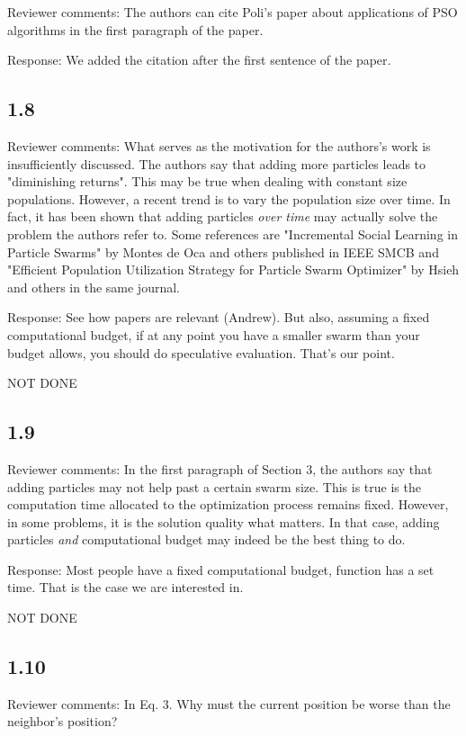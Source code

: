 \documentclass[onecolumn, 12pt]{article}
\begin{document}
Reviewer comments: The authors can cite Poli's paper about applications of PSO
algorithms in the first paragraph of the paper.

Response: We added the citation after the first sentence of the paper.

\subsection*{1.8}

Reviewer comments: What serves as the motivation for the authors's work is
insufficiently discussed.  The authors say that adding more particles leads to
"diminishing returns". This may be true when dealing with constant size
populations.  However, a recent trend is to vary the population size over time.
In fact, it has been shown that adding particles \emph{over time} may actually
solve the problem the authors refer to. Some references are "Incremental Social
Learning in Particle Swarms" by Montes de Oca and others published in IEEE SMCB
and "Efficient Population Utilization Strategy for Particle Swarm Optimizer" by
Hsieh and others in the same journal.

Response: See how papers are relevant (Andrew).  But also, assuming a fixed
computational budget, if at any point you have a smaller swarm than your budget
allows, you should do speculative evaluation.  That's our point.

NOT DONE

\subsection*{1.9}

Reviewer comments: In the first paragraph of Section 3, the authors say that
adding particles may not help past a certain swarm size. This is true is the
computation time allocated to the optimization process remains fixed. However,
in some problems, it is the solution quality what matters. In that case, adding
particles \emph{and} computational budget may indeed be the best thing to do.

Response: Most people have a fixed computational budget, function has a set
time.  That is the case we are interested in.

NOT DONE

\subsection*{1.10}

Reviewer comments: In Eq. 3. Why must the current position be worse than the
neighbor's position?
\end{document}
